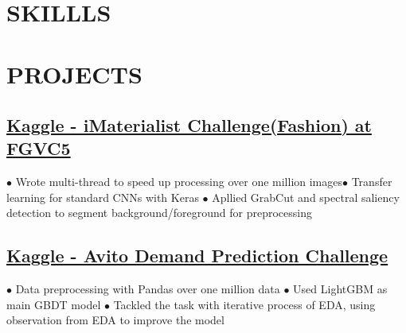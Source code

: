 \documentclass[11pt,a4paper]{moderncv}
\title{  }
\begin{document}
\maketitle
\vspace*{-18mm}

\section{SKILLLS}
\vspace{-0.7\baselineskip}

\section{PROJECTS}
\subsection{\href{https://www.kaggle.com/c/imaterialist-challenge-fashion-2018}{Kaggle - iMaterialist Challenge(Fashion) at FGVC5}}
{\footnotesize{$\bullet$ Wrote multi-thread to speed up processing over one million images\space\space $\bullet$ Transfer learning for standard CNNs with Keras
\newline $\bullet$ Apllied GrabCut and spectral saliency detection to segment background/foreground for preprocessing}}

\subsection{\href{https://www.kaggle.com/c/avito-demand-prediction}{Kaggle - Avito Demand Prediction Challenge}}
{\footnotesize{$\bullet$ Data preprocessing with Pandas over one million data \space\space $\bullet$ Used LightGBM as main GBDT model
\newline $\bullet$ Tackled the task with iterative process of EDA, using observation from EDA to improve the model}}
\end{document}

